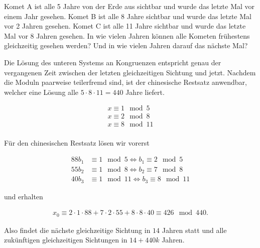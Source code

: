 
\begin{exercise}

Komet A ist alle 5 Jahre von der Erde aus sichtbar und wurde das letzte
Mal vor einem Jahr gesehen. Komet B ist alle 8 Jahre sichtbar und wurde
das letzte Mal vor 2 Jahren gesehen. Komet C ist alle 11 Jahre sichtbar
und wurde das letzte Mal vor 8 Jahren gesehen. In wie vielen Jahren
können alle Kometen frühestens gleichzeitig gesehen werden?
Und in wie vielen Jahren darauf das nächste Mal?

\end{exercise}


\begin{solution}

Die Lösung des unteren Systems an Kongruenzen entspricht
genau der vergangenen Zeit zwischen der letzten gleichzeitigen Sichtung
und jetzt. Nachdem die Moduln paarweise teilerfremd sind, ist der chinesische
Restsatz anwendbar, welcher eine Lösung alle $5\cdot 8 \cdot 11 = 440$
Jahre liefert.

\begin{align*}
    x \equiv 1 \mod{5} \\
    x \equiv 2 \mod{8} \\
    x \equiv 8 \mod{11} \\
\end{align*}

Für den chinesischen Restsatz lösen wir vorerst

\begin{align*}
    88b_1 &\equiv 1 \mod{5} \iff b_1 \equiv 2 \mod{5} \\
    55b_2 &\equiv 1 \mod{8} \iff b_2 \equiv 7 \mod{8} \\
    40b_3 &\equiv 1 \mod{11} \iff b_3 \equiv 8 \mod{11}
\end{align*}

und erhalten 

\begin{align*}
    x_0 \equiv 2 \cdot 1\cdot 88 + 7 \cdot 2 \cdot 55 + 8 \cdot 8 \cdot 40
    \equiv 426 \mod{440}.
\end{align*}

Also findet die nächste gleichzeitige Sichtung in $14$ Jahren statt
und alle zukünftigen gleichzeitigen Sichtungen in $14 + 440k$ Jahren.

\end{solution}

